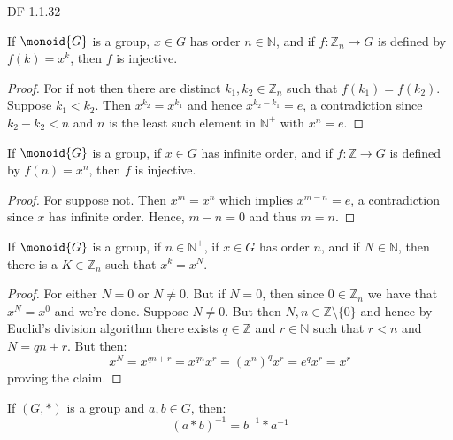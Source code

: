     DF 1.1.32
    \begin{theorem}
        If $\monoid{G}$ is a group, $x\in{G}$ has order $n\in\mathbb{N}$,
        and if $f:\mathbb{Z}_{n}\rightarrow{G}$ is defined by
        $f(k)=x^{k}$, then $f$ is injective.
    \end{theorem}
    \begin{proof}
        For if not then there are distinct $k_{1},k_{2}\in\mathbb{Z}_{n}$
        such that $f(k_{1})=f(k_{2})$. Suppose $k_{1}<k_{2}$. Then
        $x^{k_{2}}=x^{k_{1}}$ and hence $x^{k_{2}-k_{1}}=e$, a contradiction
        since $k_{2}-k_{2}<n$ and $n$ is the least such element in
        $\mathbb{N}^{+}$ with $x^{n}=e$.
    \end{proof}
    \begin{theorem}
        If $\monoid{G}$ is a group, if $x\in{G}$ has infinite order, and if
        $f:\mathbb{Z}\rightarrow{G}$ is defined by $f(n)=x^{n}$, then
        $f$ is injective.
    \end{theorem}
    \begin{proof}
        For suppose not. Then $x^{m}=x^{n}$ which implies $x^{m-n}=e$,
        a contradiction since $x$ has infinite order. Hence, $m-n=0$ and
        thus $m=n$.
    \end{proof}
    \begin{theorem}
        If $\monoid{G}$ is a group, if $n\in\mathbb{N}^{+}$, if $x\in{G}$
        has order $n$, and if $N\in\mathbb{N}$, then there is a
        $K\in\mathbb{Z}_{n}$ such that $x^{k}=x^{N}$.
    \end{theorem}
    \begin{proof}
        For either $N=0$ or $N\ne{0}$. But if $N=0$, then since
        $0\in\mathbb{Z}_{n}$ we have that $x^{N}=x^{0}$ and we're done.
        Suppose $N\ne{0}$. But then $N,n\in\mathbb{Z}\setminus\{0\}$ and
        hence by Euclid's division algorithm there exists $q\in\mathbb{Z}$
        and $r\in\mathbb{N}$ such that $r<n$ and $N=qn+r$. But then:
        \begin{equation}
            x^{N}=x^{qn+r}=x^{qn}x^{r}=(x^{n})^{q}x^{r}
            =e^{q}x^{r}=x^{r}
        \end{equation}
        proving the claim.
    \end{proof}
    \begin{theorem}
        \label{thm:Group_Inverse_of_Product}%
        If $(G,*)$ is a group and $a,b\in G$, then:
        \begin{equation}
            (a*b)^{\minus{1}}=b^{\minus{1}}*a^{\minus{1}}
        \end{equation}
    \end{theorem}
